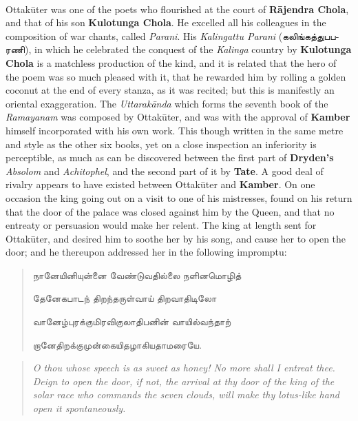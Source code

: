 \documentclass{article}
\newcommand{\TamilText}[1]{\texttamil{#1}}
\newcommand{\tam}[1]{\TamilText{#1}}
\begin{document}
\paragraph{}
Ottak\={u}ter was one of the poets who flourished at the court of \textbf{R\={a}jendra Chola}, and that of his son \textbf{Kulotunga Chola}. He excelled all his colleagues in the composition of war chants, called \emph{Parani}. His \emph{Kalingattu Parani} (\tam{கலிங்கத்துபபரணி}), in which he celebrated the conquest of the \emph{Kalinga} country by \textbf{Kulotunga Chola} is a matchless production of the kind, and it is related that the hero of the poem was so much pleased with it, that he rewarded him by rolling a golden coconut at the end of every stanza, as it was recited; but this is manifestly an oriental exaggeration. The \emph{Uttarak\={a}nda} which forms the seventh book of the \emph{Ramayanam} was composed by Ottak\={u}ter, and was with the approval of \textbf{Kamber} himself incorporated with his own work. This though written in the same metre and style as the other six books, yet on a close inspection an inferiority is perceptible, as much as can be discovered between the first part of \textbf{Dryden's} \emph{Absolom} and \emph{Achitophel}, and the second part of it by \textbf{Tate}. A good deal of rivalry appears to have existed between Ottak\={u}ter and \textbf{Kamber}. On one occasion the king going out on a visit to one of his mistresses, found on his return that the door of the palace was closed against him by the Queen, and that no entreaty or persuasion would make her relent. The king at length sent for Ottak\={u}ter, and desired him to soothe her by his song, and cause her to open the door; and he thereupon addressed her in the following impromptu:
\begin{quotation}\small
\tam{நானேயினியுன்னை வேண்டுவதில்லை நளினமொழித்}

\tam{தேனேகபாடந்‌ திறந்தருள்வாய்‌ திறவாதிடிலோ}

\tam{வானேழ்புரக்குமிரவிகுலாதிபனின்‌ வாயில்வந்தாற்‌}

\tam{றானேதிறக்குமுன்கையிதழாகியதாமரையே}.
\end{quotation}
\begin{quotation}\small
\emph{O thou whose speech is as sweet as honey! No more shall I entreat thee. Deign to open the door, if not, the arrival at thy door of the king of the solar race who commands the seven clouds, will make thy lotus-like hand open it spontaneously.}
\end{quotation}
\end{document}
